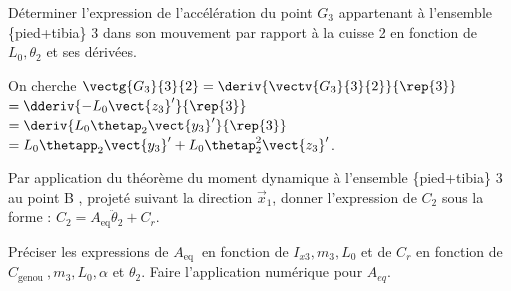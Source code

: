 \begin{question}
\label{2023_ccs_psi_q_14}
Déterminer l'expression de l'accélération du point $G_{3}$ appartenant à l'ensemble \{pied+tibia\} 3 dans son mouvement par rapport à la cuisse 2 en fonction de $L_{0}, \theta_{2}$ et ses dérivées.\\
\end{question}
\ifprof
\begin{corrige}
On cherche $\vectg{G_3}{3}{2} = \deriv{\vectv{G_3}{3}{2}}{\rep{3}}$ $= \dderiv{-L_0 \vect{z_3}'}{\rep{3}}$
$= \deriv{L_0 \thetap_2 \vect{y_3}'}{\rep{3}}$
$= L_0 \thetapp_2 \vect{y_3}' +L_0 \thetap_2^2 \vect{z_3}' $.

\end{corrige}
\else
\fi


\begin{question}
\label{2023_ccs_psi_q_15}
Par application du théorème du moment dynamique à l'ensemble \{pied+tibia\} 3 au point B , projeté suivant la direction $\vec{x}_{1}$, donner l'expression de $C_{2}$ sous la forme : $C_{2}=A_{\mathrm{eq}} \ddot{\theta}_{2}+C_{r}$.

Préciser les expressions de $A_{\text {eq }}$ en fonction de $I_{x 3}, m_{3}, L_{0}$ et de $C_{r}$ en fonction de $C_{\text {genou }}, m_{3}, L_{0}, \alpha$ et $\theta_{2}$. Faire l'application numérique pour $A_{e q}$.
\end{question}
\ifprof
